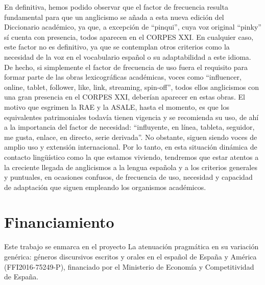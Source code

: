 \documentclass{textolivre}
\begin{document}
En definitiva, hemos podido observar que el factor de frecuencia resulta fundamental para que un anglicismo se añada a esta nueva edición del Diccionario académico, ya que, a excepción de “pinqui”, cuya voz original “pinky” sí cuenta con presencia, todos aparecen en el CORPES XXI. En cualquier caso, este factor no es definitivo, ya que se contemplan otros criterios como la necesidad de la voz en el vocabulario español o su adaptabilidad a este idioma. De hecho, si simplemente el factor de frecuencia de uso fuera el requisito para formar parte de las obras lexicográficas académicas, voces como “influencer, online, tablet, follower, like, link, streaming, spin-off”, todos ellos anglicismos con una gran presencia en el CORPES XXI, deberían aparecer en estas obras. El motivo que esgrimen la RAE y la ASALE, hasta el momento, es que los equivalentes patrimoniales todavía tienen vigencia y se recomienda su uso, de ahí a la importancia del factor de necesidad: “influyente, en línea, tableta, seguidor, me gusta, enlace, en directo, serie derivada”. No obstante, siguen siendo voces de amplio uso y extensión internacional. Por lo tanto, en esta situación dinámica de contacto lingüístico como la que estamos viviendo, tendremos que estar atentos a la creciente llegada de anglicismos a la lengua española y a los criterios generales y puntuales, en ocasiones confusos, de frecuencia de uso, necesidad y capacidad de adaptación que siguen empleando los organismos académicos.



\section*{Financiamiento}
Este trabajo se enmarca en el proyecto La atenuación pragmática en su variación genérica: géneros discursivos escritos y orales en el español de España y América (FFI2016-75249-P), financiado por el Ministerio de Economía y Competitividad de España.




\printbibliography\label{sec-bib}
\end{document}
